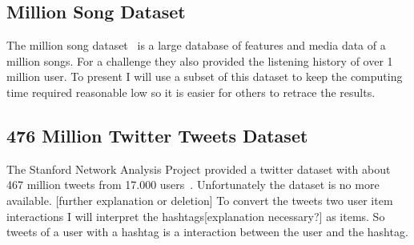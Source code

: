 \subsection{Million Song Dataset}
The million song dataset~\cite{Bertin-Mahieux2011} is a large database of features and media data
of a million songs. For a challenge they also provided the listening history of over 1 million
user. To present I will use a subset of this dataset to keep the computing time required
reasonable low so it is easier for others to retrace the results.


\subsection{476 Million Twitter Tweets Dataset}
The Stanford Network Analysis Project provided a twitter dataset with about 467 million tweets from 17.000 users~\cite{snap}.
Unfortunately the dataset is no more available. [further explanation or deletion]
To convert the tweets two user item interactions I will interpret the hashtags[explanation necessary?] as items.
So tweets of a user with a hashtag is a interaction between the user and the hashtag.
